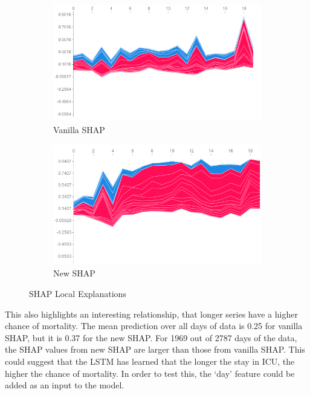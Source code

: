 \documentclass[12pt]{article}
\begin{document}
\begin{figure}[H]
     \centering
     \begin{subfigure}[b]{0.47\textwidth}
         \centering
         \includegraphics[width=\linewidth]{Vanilla SHAP Local ICU.png}
         \caption{Vanilla SHAP}
     \end{subfigure}
     \hfill
     \begin{subfigure}[b]{0.47\textwidth}
         \centering
         \includegraphics[width=\linewidth]{New SHAP Local.png}
         \caption{New SHAP}
     \end{subfigure}
     \caption{SHAP Local Explanations}
 \label{SHAP Local Explanations}
\end{figure}

This also highlights an interesting relationship, that longer series have a higher chance of mortality. The mean prediction over all days of data is 0.25 for vanilla SHAP, but it is 0.37 for the new SHAP. For 1969 out of 2787 days of the data, the SHAP values from new SHAP are larger than those from vanilla SHAP. This could suggest that the LSTM has learned that the longer the stay in ICU, the higher the chance of mortality. In order to test this, the `day' feature could be added as an input to the model. 
\end{document}
